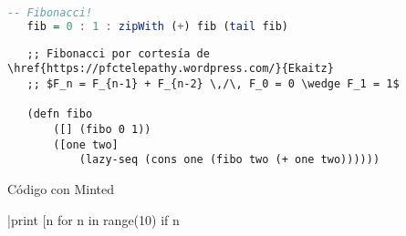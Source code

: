 \documentclass[a4paper,11pt]{article}
\begin{document}
  \listoflistings
  
  \begin{lstlisting}[language=haskell, caption=Código con Listings, captionpos=b]
   -- Fibonacci!
   fib = 0 : 1 : zipWith (+) fib (tail fib)
  \end{lstlisting}
  
  \begin{listing}
   \begin{verbatim}
   ;; Fibonacci por cortesía de \href{https://pfctelepathy.wordpress.com/}{Ekaitz}
   ;; $F_n = F_{n-1} + F_{n-2} \,/\, F_0 = 0 \wedge F_1 = 1$
   
   (defn fibo
       ([] (fibo 0 1))
       ([one two]
           (lazy-seq (cons one (fibo two (+ one two))))))
   \end{verbatim}
   \label{lst:fibo}
   \caption{Código con Minted}
  \end{listing}  
  
  \py|print [n for n in range(10) if n%
  
  \inputminted{python}{fibonacci.py}
  
\end{document}
